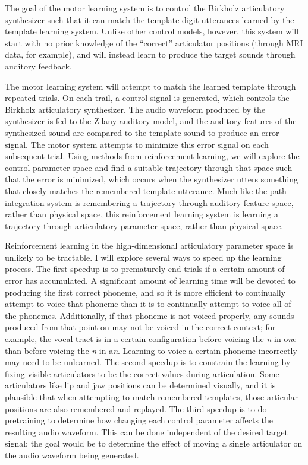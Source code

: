 \documentclass{article}
\begin{document}
The goal of the motor learning system
is to control the Birkholz articulatory synthesizer
such that it can match
the template digit utterances learned
by the template learning system.
Unlike other control models, however,
this system will start with
no prior knowledge
of the ``correct'' articulator positions
(through MRI data, for example),
and will instead learn
to produce the target sounds
through auditory feedback.

The motor learning system will
attempt to match the learned template
through repeated trials.
On each trail,
a control signal is generated,
which controls the Birkholz
articulatory synthesizer.
The audio waveform produced
by the synthesizer is fed
to the Zilany auditory model,
and the auditory features
of the synthesized sound
are compared to the template sound
to produce an error signal.
The motor system attempts
to minimize this error signal
on each subsequent trial.
Using methods from
reinforcement learning,
we will explore the control parameter space
and find a suitable trajectory
through that space
such that the error is minimized,
which occurs when the synthesizer
utters something that closely matches
the remembered template utterance.
Much like the path integration system
is remembering a trajectory through
auditory feature space,
rather than physical space,
this reinforcement learning system
is learning a trajectory through
articulatory parameter space,
rather than physical space.

Reinforcement learning in the high-dimensional
articulatory parameter space
is unlikely to be tractable.
I will explore several ways to speed up
the learning process.
The first speedup is to prematurely end trials
if a certain amount of error has accumulated.
A significant amount of learning time will
be devoted to producing the first correct phoneme,
and so it is more efficient to continually
attempt to voice that phoneme
than it is to continually attempt to voice
all of the phonemes.
Additionally, if that phoneme is not voiced properly,
any sounds produced from that point on
may not be voiced in the correct context;
for example, the vocal tract is in a certain
configuration before voicing the \textit{n}
in o\textit{n}e than before
voicing the \textit{n} in a\textit{n}.
Learning to voice a certain phoneme incorrectly
may need to be unlearned.
The second speedup is to constrain the learning
by fixing visible articulators to be
the correct values during articulation.
Some articulators like lip and jaw positions
can be determined visually,
and it is plausible that when attempting
to match remembered templates,
those articular positions are also
remembered and replayed.
The third speedup is to
do pretraining to determine
how changing each control parameter
affects the resulting audio waveform.
This can be done independent
of the desired target signal;
the goal would be to determine
the effect of moving a single articulator
on the audio waveform being generated.
\end{document}
